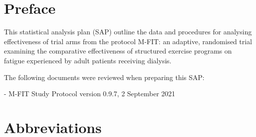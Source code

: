 \documentclass[11pt,parskip=half-]{scrartcl}
\begin{document}
\clearpage

\section*{Preface}
\label{preface}

This statistical analysis plan (SAP) outline the data and procedures for analysing effectiveness of trial arms from the protocol M-FIT: an adaptive, randomised trial examining the comparative effectiveness of structured exercise programs on fatigue experienced by adult patients receiving dialysis.

The following documents were reviewed when preparing this SAP:

- M-FIT Study Protocol version 0.9.7, 2 September 2021

\clearpage

\section*{Abbreviations}
\label{abbreviations}
\end{document}
